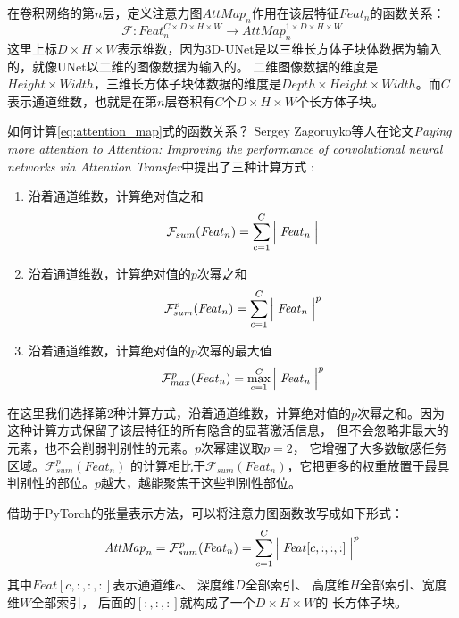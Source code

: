 在卷积网络的第$n$层，定义注意力图$\mathit{AttMap}_{n}$作用在该层特征$\mathit{Feat}_{n}$的函数关系：
\begin{equation}\label{eq:attention_map}
    \mathcal{F}: \mathit{Feat}_{n}^{C \times D \times H \times W} \longrightarrow \mathit{AttMap}_{n}^{1 \times D \times H \times W}
\end{equation}
这里上标$D \times H \times W$表示维数，因为3D-UNet是以三维长方体子块体数据为输入的，就像UNet以二维的图像数据为输入的。
二维图像数据的维度是$Height \times Width$，三维长方体子块体数据的维度是$Depth \times Height \times Width$。而$C$
表示通道维数，也就是在第$n$层卷积有$C$个$D \times H \times W$个长方体子块。

如何计算\ref{eq:attention_map}式的函数关系？ Sergey Zagoruyko等人在论文\textit{Paying more attention to Attention: 
Improving the performance of convolutional neural networks via Attention Transfer}中提出了三种计算方式
\cite{Zagoruyko2016PayingMA}:
\begin{enumerate}
    \item 沿着通道维数，计算绝对值之和  
    \begin{equation}
        \mathcal{F}_{sum}(\mathit{Feat}_{n}) = \sum_{c=1}^{C}{\Bigm| \mathit{Feat}_{n}\Bigm|}
    \end{equation}
    
    \item 沿着通道维数，计算绝对值的$p$次幂之和
    \begin{equation}
        \mathcal{F}_{sum}^{p}(\mathit{Feat}_{n}) = \sum_{c=1}^{C}{\Bigm| \mathit{Feat}_{n} \Bigm|}^{p}
    \end{equation}
    
    \item 沿着通道维数，计算绝对值的$p$次幂的最大值
    \begin{equation}
        \mathcal{F}_{max}^{p}(\mathit{Feat}_{n}) = \max_{c=1}^{C}{\Bigm| \mathit{Feat}_{n} \Bigm|}^{p}
    \end{equation}
\end{enumerate}
在这里我们选择第2种计算方式，沿着通道维数，计算绝对值的$p$次幂之和。因为这种计算方式保留了该层特征的所有隐含的显著激活信息，
但不会忽略非最大的元素，也不会削弱判别性的元素。$p$次幂建议取$p = 2$， 它增强了大多数敏感任务区域。$\mathcal{F}_{sum}^{p}({Feat}_{n})$
的计算相比于$\mathcal{F}_{sum}(\mathit{Feat}_{n})$，它把更多的权重放置于最具判别性的部位。$p$越大，越能聚焦于这些判别性部位。

借助于PyTorch的张量表示方法，可以将注意力图函数改写成如下形式：
\begin{equation}
    \mathit{AttMap}_{n} = \mathcal{F}_{sum}^{p}(\mathit{Feat}_{n}) = \sum_{c=1}^{C}{\Bigm|{\mathit{Feat}}[c, :, :, :]\Bigm|}^{p}
\end{equation}
其中$\mathit{Feat}[c, :, :, :]$表示通道维$c$、 深度维$D$全部索引、 高度维$H$全部索引、宽度维$W$全部索引， 后面的$[:, :, :]$就构成了一个$D \times H \times W$的
长方体子块。

